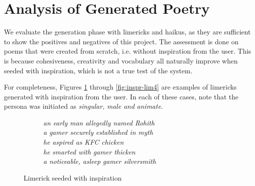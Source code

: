 \section{Analysis of Generated Poetry}
\label{sec:eval-gen}
We evaluate the generation phase with limericks and haikus, as they are sufficient to show the positives and negatives of this project. The assessment is done on poems that were created from scratch, i.e. without inspiration from the user. This is because cohesiveness, creativity and vocabulary all naturally improve when seeded with inspiration, which is not a true test of the system.

For completeness, Figures \ref{fig:inspr-lim1} through \ref{fig:inspr-lim4} are examples of limericks generated with inspiration from the user. In each of these cases, note that the persona was initiated as \textit{singular, male and animate}.

\begin{figure}[H]
\centering
\begin{subfigure}[t!]{0.4\textwidth}
	\centering
\end{subfigure}
\begin{subfigure}[t!]{0.5\textwidth}
	\centering
    \textit{an early man allegedly named Rohith\\a gamer securely established in myth\\he aspired as KFC chicken\\he smarted with gamer thicken\\a noticeable, asleep gamer silversmith}
\end{subfigure}
\caption{Limerick seeded with inspiration}
\label{fig:inspr-lim1}
\end{figure}

